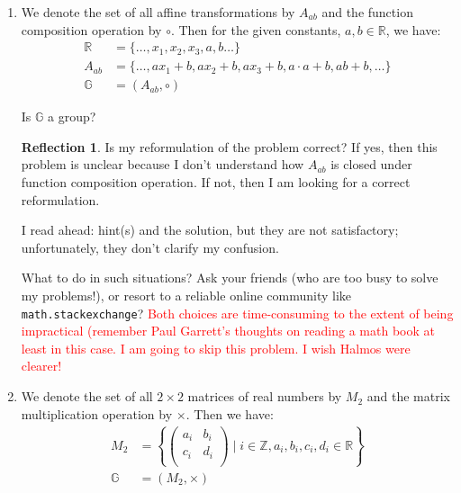 \documentclass[english,notitlepage,smartquotes]{hgbreport}
\theoremstyle{definition}
\theoremstyle{definition}
\theoremstyle{remark}
\theoremstyle{definition}
\theoremstyle{plain}
\theoremstyle{definition}
\newtheorem{reflection}{Reflection}
\begin{document}
\begin{enumerate}

\item We denote the set of all affine transformations by $A_{ab}$ and the function composition operation by $\circ$. Then for the given constants, $a,b\in\mathbb{R}$, we have:
\begin{equation}
\begin{aligned}
\mathbb{R}&=\{\dots,x_1,x_2,x_3,a,b\dots\}\\
A_{ab}&=\{\dots,ax_1+b,ax_2+b,ax_3+b,a\cdot a+b,ab+b,\dots\}\\
\mathbb{G}&=(A_{ab},\circ)
\end{aligned}\label{eq:affinegroup}
\end{equation}

Is $\mathbb{G}$ a group?

\begin{reflection}
Is my reformulation of the problem correct? If yes, then this problem is unclear because I don't understand how ${A_{ab}}$ is closed under function composition operation. If not, then I am looking for a correct reformulation.

I read ahead: hint(s) and the solution, but they are not satisfactory; unfortunately, they don't clarify my confusion. 

What to do in such situations? Ask your friends (who are too busy to solve my problems!), or resort to a reliable online community like \texttt{math.stackexchange}? \textcolor{red} {Both choices are time-consuming to the extent of being impractical (remember Paul Garrett's thoughts on reading a math book \cite{PaulGarrettMathSE} at least in this case. I am going to skip this problem. I wish Halmos were clearer!}
\end{reflection}

\item We denote the set of all $2\times 2$ matrices of real numbers by $M_2$ and the matrix multiplication operation by $\times$. Then we have:
\begin{equation}
\begin{aligned}
M_2&=\left\{
  \begin{pmatrix}
    a_i & b_i\\
    c_i & d_i\\
  \end{pmatrix}
  \mid
  i\in\mathbb{Z}, a_i,b_i,c_i,d_i\in\mathbb{R}
\right\}\\
\mathbb{G}&=(M_2,\times)
\end{aligned}\label{eq:mmultgrp}
\end{equation}


\end{enumerate}
\end{document}
